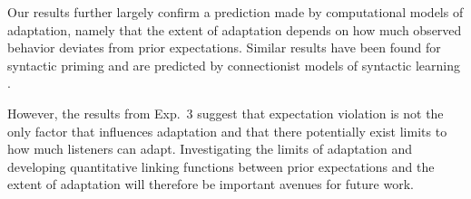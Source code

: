 Our results further largely confirm a prediction made by computational models of adaptation, namely that the extent of adaptation depends on how much observed behavior deviates from prior expectations. Similar results have been found for syntactic priming \cite{Jaeger2013} and are predicted by connectionist models of syntactic learning \cite{Chang2006}.

However, the results from Exp.~3 suggest that expectation violation is not the only factor that influences adaptation and that there potentially exist limits to how much listeners can adapt. Investigating the limits of adaptation and developing quantitative linking functions between prior expectations and the extent of adaptation will therefore be important avenues for future work. 
